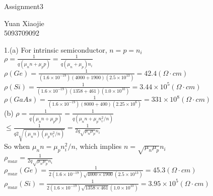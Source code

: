 \documentclass[11pt,oneside,a4paper]{article}
\begin{document}
\begin{center}Assignment3\\\end{center}
\begin{flushright}Yuan Xiaojie\\5093709092\\\end{flushright}
1.\:(a) For intrinsic semiconductor, \(n=p=n_i\) \\

\hspace{8.5mm} \(\rho=\frac{1}{q(\mu_nn+\mu_pp)}=\frac{1}{q(\mu_n+\mu_p)n_i}\) \\

\hspace{8.5mm} \(\rho(Ge)=\frac{1}{(1.6\times10^{-19})(4000+1900)(2.5\times10^{13})}=42.4 (\Omega\cdot cm)\) \\

\hspace{8.5mm} \(\rho(Si)=\frac{1}{(1.6\times10^{-19})(1358+461)(1.0\times10^{10})}=3.44\times10^5 (\Omega\cdot cm)\) \\

\hspace{8.5mm} \(\rho(GaAs)=\frac{1}{(1.6\times10^{-19})(8000+400)(2.25\times10^6)}=331\times10^8 (\Omega\cdot cm)\) \\

\quad (b) \(\rho=\frac{1}{q(\mu_nn+\mu_pp)}=\frac{1}{q(\mu_nn+\mu_pn_i^2/n)}\) \\

\hspace{8.5mm}\quad \(\leq\frac{1}{q2\sqrt{(\mu_nn)(\mu_pn_i^2/n)}}=\frac{1}{2q\sqrt{\mu_n\mu_p}n_i}\) \\

\hspace{8.5mm} So when \(\mu_nn=\mu_pn_i^2/n\), which implies \(n=\sqrt{\mu_n\mu_p}n_i\) \\

\hspace{8.5mm} \(\rho_{max}=\frac{1}{2q\sqrt{\mu_n\mu_p}n_i}\) \\

\hspace{8.5mm} \(\rho_{max}(Ge)=\frac{1}{2(1.6\times10^{-19})\sqrt{4000\times1900}(2.5\times10^{13})}=45.3 (\Omega\cdot cm)\) \\

\hspace{8.5mm} \(\rho_{max}(Si)=\frac{1}{2(1.6\times10^{-19})\sqrt{1358\times461}(1.0\times10^{10})}=3.95\times10^5 (\Omega\cdot cm)\) \\
\end{document}
